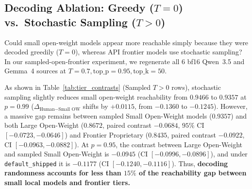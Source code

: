 \documentclass[11pt,a4paper,twocolumn]{article}
\begin{document}
\subsection{Decoding Ablation: Greedy ($T=0$) vs.\ Stochastic Sampling ($T>0$)}
Could small open-weight models appear more reachable simply because they were decoded greedily ($T=0$), whereas API frontier models use stochastic sampling? In our sampled-open-frontier experiment, we regenerate all 6 bf16 Qwen~3.5 and Gemma~4 sources at $T=0.7, \text{top\_p}=0.95, \text{top\_k}=50$.

As shown in Table~\ref{tab:tier_contrasts} (Sampled $T>0$ rows), stochastic sampling slightly reduces small open-weight reachability from $0.9466$ to $0.9357$ at $p=0.99$ ($\Delta_{\text{Human}-\text{Small OW}}$ shifts by $+0.0115$, from $-0.1360$ to $-0.1245$). However, a massive gap remains between sampled Small Open-Weight models ($0.9357$) and both Large Open-Weight ($0.8672$, paired contrast $-0.0684$, $95\%$ CI $[-0.0723, -0.0646]$) and Frontier Proprietary ($0.8435$, paired contrast $-0.0922$, CI $[-0.0963, -0.0882]$). At $p=0.95$, the contrast between Large Open-Weight and sampled Small Open-Weight is $-0.0945$ (CI $[-0.0996, -0.0896]$), and under \texttt{default\_shipped} it is $-0.1177$ (CI $[-0.1240, -0.1116]$). Thus, \textbf{decoding randomness accounts for less than $15\%$ of the reachability gap between small local models and frontier tiers.}
\end{document}
